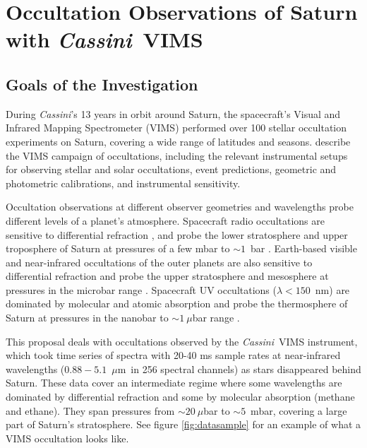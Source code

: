 \documentclass[preprint]{aastex}
\newcommand{\microns}{$\mu$m}     %
\newcommand{\Cas}{{\it Cassini}}
\begin{document}
\section*{Occultation Observations of Saturn with \Cas~VIMS}
\maketitle

\begin{multicols}{2}

\vspace{-9mm}
\section{Goals of the Investigation}
\vspace{-3mm}

During \Cas's 13 years in orbit around Saturn, the spacecraft's Visual and
Infrared Mapping Spectrometer (VIMS) performed over 100 stellar occultation
experiments on Saturn, covering a wide range of latitudes and seasons.
\cite{occpaperI} describe the VIMS campaign of occultations, including the
relevant instrumental setups for observing stellar and solar occultations,
event predictions, geometric and photometric calibrations, and instrumental
sensitivity. 

Occultation observations at different observer geometries and wavelengths probe
different levels of a planet's atmosphere. Spacecraft radio occultations are
sensitive to differential refraction \citep{Kliore04}, and probe the lower
stratosphere and upper troposphere of Saturn at pressures of a few mbar to
$\sim1$~bar \citep{Lindal85}.  Earth-based visible and near-infrared
occultations of the outer planets are also sensitive to differential refraction
and probe the upper stratosphere and mesosphere at pressures in the microbar
range \citep{ElliotVeverka76, Elliot79, French78}.  Spacecraft UV occultations
($\lambda < 150$~nm) are dominated by molecular and atomic absorption and probe
the thermosphere of Saturn at pressures in the nanobar to $\sim1~\mu$bar range
\citep{Broadfoot81, Sandel82, Smith83}.

This proposal deals with occultations observed by the \Cas~VIMS instrument,
which took time series of spectra with 20-40 ms sample rates at near-infrared
wavelengths ($0.88 - 5.1$~\microns\ in 256 spectral channels) as stars
disappeared behind Saturn. These data cover an intermediate regime where some
wavelengths are dominated by differential refraction and some by molecular
absorption (methane and ethane). They span pressures from $\sim20~\mu$bar to
$\sim5$~mbar, covering a large part of Saturn's stratosphere. See figure
\ref{fig:datasample} for an example of what a VIMS occultation looks like.


\end{multicols}
\end{document}
